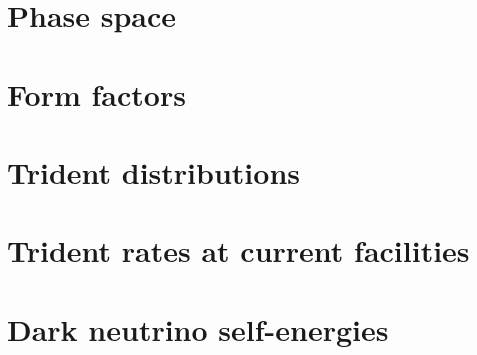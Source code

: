 \documentclass[openany,twoside,frontopenright,chaprunninghead]{ip3thesis}
\begin{document}
\appendixpageoff
\begin{appendices}
\let\clearpage\relax
\chapter{Phase space}\label{app:phase_space}


\chapter{Form factors}\label{app:form_factors}


\chapter{Trident distributions}\label{app:trident_distributions}


\chapter{Trident rates at current facilities}\label{app:rates_other}


\chapter{Dark neutrino self-energies}\label{app:loop_masses}

\end{appendices}



\end{document}
